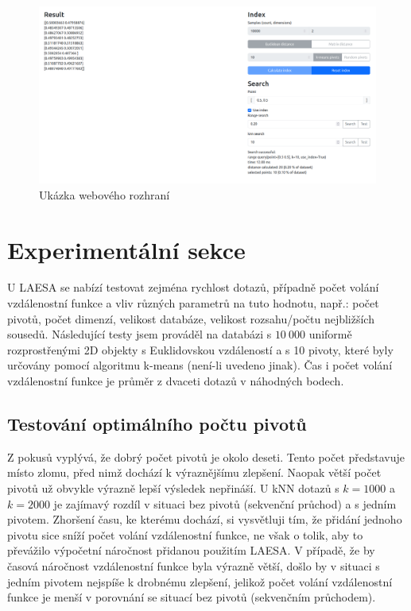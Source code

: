 \documentclass{article}
\begin{document}
\begin{figure}[H]
    \centering
    \includegraphics[width=\textwidth]{img/web_gui.png}
    \caption{Ukázka webového rozhraní}
\end{figure}

\section{Experimentální sekce}

U LAESA se nabízí testovat zejména rychlost dotazů, případně počet volání vzdálenostní funkce a vliv různých parametrů na tuto hodnotu, např.: počet pivotů, počet dimenzí, velikost databáze, velikost rozsahu/počtu nejbližších sousedů. Následující testy jsem prováděl na databázi s $10\ 000$ uniformě rozprostřenými 2D objekty s Euklidovskou vzdáleností a s 10 pivoty, které byly určovány pomocí algoritmu k-means (není-li uvedeno jinak). Čas i počet volání vzdálenostní funkce je průměr z dvaceti dotazů v náhodných bodech.

\subsection{Testování optimálního počtu pivotů}
Z pokusů vyplývá, že dobrý počet pivotů je okolo deseti. Tento počet představuje místo zlomu, před nimž dochází k výraznějšímu zlepšení. Naopak větší počet pivotů už obvykle výrazně lepší výsledek nepřináší. U kNN dotazů s $k = 1000$ a $k = 2000$ je zajímavý rozdíl v situaci bez pivotů (sekvenční průchod) a s jedním pivotem. Zhoršení času, ke kterému dochází, si vysvětluji tím, že přidání jednoho pivotu sice sníží počet volání vzdálenostní funkce, ne však o tolik, aby to převážilo výpočetní náročnost přidanou použitím LAESA. V případě, že by časová náročnost vzdálenostní funkce byla výrazně větší, došlo by v situaci s jedním pivotem nejspíše k drobnému zlepšení, jelikož počet volání vzdálenostní funkce je menší v porovnání se situací bez pivotů (sekvenčním průchodem).
\end{document}
